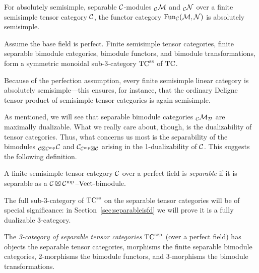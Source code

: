 \documentclass{amsart}
\begin{document}
\begin{corollary} \label{cor:funsemi}
For absolutely semisimple, separable $\mathcal C$-modules ${}_\mathcal C \mathcal M$ and ${}_\mathcal C \mathcal N$ over a finite semisimple tensor category $\mathcal C$, the functor category $\operatorname{Fun}_{\mathcal C}(\mathcal M,\mathcal N)$ is absolutely semisimple.
\end{corollary}

\begin{corollary} \label{cor:septc}
Assume the base field is perfect.  Finite semisimple tensor categories, finite separable bimodule categories, bimodule functors, and bimodule transformations, form a symmetric monoidal sub-3-category ${\mathrm{TC}^{\mathrm{ss}}}$ of $\mathrm{TC}$.
\end{corollary}
\nid Because of the perfection assumption, every finite semisimple linear category is absolutely semisimple---this ensures, for instance, that the ordinary Deligne tensor product of semisimple tensor categories is again semisimple.


As mentioned, we will see that separable bimodule categories ${}_\mathcal C \mathcal M_\mathcal D$ are maximally dualizable.  What we really care about, though, is the dualizability of tensor categories.  Thus, what concerns us most is the separability of the bimodules ${}_{\mathcal C \boxtimes \mathcal C^{\mathrm{mp}}} \mathcal C$ and $\mathcal C_{\mathcal C^{\mathrm{mp}} \boxtimes \mathcal C}$ arising in the 1-dualizability of $\mathcal C$.  This suggests the following definition.
\begin{definition}
A finite semisimple tensor category $\mathcal C$ over a perfect field is \emph{separable} if it is separable as a $\mathcal C \boxtimes \mathcal C^{\mathrm{mp}}$--$\mathrm{Vect}$-bimodule.
\end{definition}
\nid The full sub-3-category of ${\mathrm{TC}^{\mathrm{ss}}}$ on the separable tensor categories will be of special significance: in Section~\ref{sec:separableisfd} we will prove it is a fully dualizable 3-category.
\begin{definition}
The \emph{3-category of separable tensor categories} ${\mathrm{TC}^{\mathrm{sep}}}$ (over a perfect field) has objects the separable tensor categories, morphisms the finite separable bimodule categories, 2-morphisms the bimodule functors, and 3-morphisms the bimodule transformations.
\end{definition}
\end{document}
